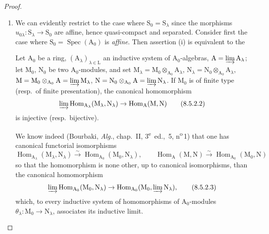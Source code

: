 \begin{proof}
\begin{enumerate}[label=(\roman*)]
  \item We can evidently restrict to the case where $\mathrm{S}_0=\mathrm{S}_\lambda$ since the morphisms $u_{0\lambda}:\mathrm{S}_\lambda\to\mathrm{S}_0$ are affine, hence quasi-compact and separated.
Consider first the case where $\mathrm{S}_0=\operatorname{Spec}(\mathrm{A}_0)$ is \emph{affine}.
Then assertion (i) is equivalent to the

\begin{lemma}[8.5.2.1]
\label{IV.8.5.2.1}
Let $\mathrm{A}_0$ be a ring, $(\mathrm{A}_\lambda)_{\lambda\in\mathrm{L}}$ an inductive system of $\mathrm{A}_0$-algebras, $\mathrm{A}=\varinjlim\mathrm{A}_\lambda$; let $\mathrm{M}_0$, $\mathrm{N}_0$ be two $\mathrm{A}_0$-modules, and set $\mathrm{M}_\lambda=\mathrm{M}_0\otimes_{\mathrm{A}_0}\mathrm{A}_\lambda$, $\mathrm{N}_\lambda=\mathrm{N}_0\otimes_{\mathrm{A}_0}\mathrm{A}_\lambda$, $\mathrm{M}=\mathrm{M}_0\otimes_{\mathrm{A}_0}\mathrm{A}=\varinjlim\mathrm{M}_\lambda$, $\mathrm{N}=\mathrm{N}_0\otimes_{\mathrm{A}_0}\mathrm{A}=\varinjlim\mathrm{N}_\lambda$.
If $\mathrm{M}_0$ is of finite type (resp.\ of finite presentation), the canonical homomorphism
\begin{equation}
  \varinjlim\operatorname{Hom}_{\mathrm{A}_\lambda}(\mathrm{M}_\lambda,\mathrm{N}_\lambda)\to\operatorname{Hom}_\mathrm{A}(\mathrm{M},\mathrm{N})
  \tag{8.5.2.2}
\end{equation}
is injective (resp.\ bijective).
\end{lemma}

We know indeed (Bourbaki, \emph{Alg.}, chap.~II, 3\textsuperscript{e}~ed., \textsection\,5, n\textsuperscript{o}\,1) that one has canonical functorial isomorphisms
\[
  \operatorname{Hom}_{\mathrm{A}_\lambda}(\mathrm{M}_\lambda,\mathrm{N}_\lambda)\xrightarrow{\sim}\operatorname{Hom}_{\mathrm{A}_0}(\mathrm{M}_0,\mathrm{N}_\lambda),\qquad\operatorname{Hom}_\mathrm{A}(\mathrm{M},\mathrm{N})\xrightarrow{\sim}\operatorname{Hom}_{\mathrm{A}_0}(\mathrm{M}_0,\mathrm{N})
\]
so that the homomorphism  is none other, up to canonical isomorphisms, than the canonical homomorphism
\begin{equation}
  \varinjlim\operatorname{Hom}_{\mathrm{A}_0}(\mathrm{M}_0,\mathrm{N}_\lambda)\to\operatorname{Hom}_{\mathrm{A}_0}(\mathrm{M}_0,\varinjlim\mathrm{N}_\lambda),
  \tag{8.5.2.3}
\end{equation}
which, to every inductive system of homomorphisms of $\mathrm{A}_0$-modules $\theta_\lambda:\mathrm{M}_0\to\mathrm{N}_\lambda$, associates its inductive limit.


\end{enumerate}
\end{proof}
